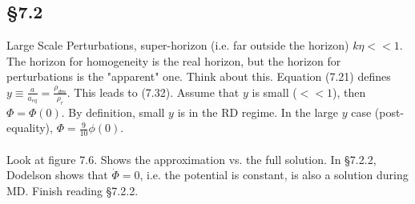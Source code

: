 \documentclass[12pt]{article}
\begin{document}
\subsection*{\S 7.2}
Large Scale Perturbations, super-horizon (i.e. far outside the horizon) $k\eta<<1$.  The horizon for homogeneity is the real horizon, but the horizon for perturbations is the "apparent" one.  Think about this.  Equation (7.21) defines $y\equiv\frac{a}{a_{eq}}=\frac{\rho_{dm}}{\rho_r}$.  This leads to (7.32).  Assume that $y$ is small ($<<1$), then $\Phi=\Phi(0)$.  By definition, small $y$ is in the RD regime.  In the large $y$ case (post-equality), $\Phi=\frac{9}{10}\phi(0)$.
\\ \\
Look at figure 7.6.  Shows the approximation vs. the full solution.  In \S 7.2.2, Dodelson shows that $\dot{\Phi}=0$, i.e. the potential is constant, is also a solution during MD.  Finish reading \S 7.2.2.
\end{document}
